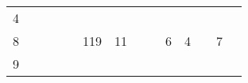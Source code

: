 \documentclass[]{article}
\begin{document}
{\begin{longtable}[]{@{}rrrrrrrrrrrrrr@{}}
\begin{minipage}[t]{0.04\columnwidth}
4\strut
\end{minipage}\tabularnewline
\begin{minipage}[t]{0.05\columnwidth}\raggedleft\strut
8\strut
\end{minipage} & \begin{minipage}[t]{0.05\columnwidth}\raggedleft\strut
\strut
\end{minipage} & \begin{minipage}[t]{0.05\columnwidth}\raggedleft\strut
\strut
\end{minipage} & \begin{minipage}[t]{0.05\columnwidth}\raggedleft\strut
\strut
\end{minipage} & \begin{minipage}[t]{0.05\columnwidth}\raggedleft\strut
\strut
\end{minipage} & \begin{minipage}[t]{0.05\columnwidth}\raggedleft\strut
119\strut
\end{minipage} & \begin{minipage}[t]{0.05\columnwidth}\raggedleft\strut
11\strut
\end{minipage} & \begin{minipage}[t]{0.04\columnwidth}\raggedleft\strut
\strut
\end{minipage} & \begin{minipage}[t]{0.05\columnwidth}\raggedleft\strut
\strut
\end{minipage} & \begin{minipage}[t]{0.04\columnwidth}\raggedleft\strut
6\strut
\end{minipage} & \begin{minipage}[t]{0.04\columnwidth}\raggedleft\strut
4\strut
\end{minipage} & \begin{minipage}[t]{0.04\columnwidth}\raggedleft\strut
\strut
\end{minipage} & \begin{minipage}[t]{0.04\columnwidth}\raggedleft\strut
7\strut
\end{minipage} & \begin{minipage}[t]{0.04\columnwidth}\raggedleft\strut
\strut
\end{minipage}\tabularnewline
\begin{minipage}[t]{0.05\columnwidth}\raggedleft\strut
9\strut
\end{minipage} & \begin{minipage}[t]{0.05\columnwidth}\raggedleft\strut
\strut
\end{minipage} & \begin{minipage}[t]{0.05\columnwidth}\raggedleft\strut

\end{minipage}
\end{longtable}}
\end{document}
